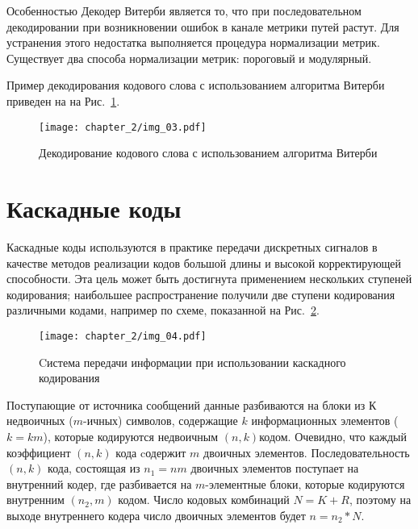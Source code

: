 Особенностью Декодер Витерби является то, что при последовательном декодировании при возникновении
ошибок в канале метрики путей растут. Для устранения этого недостатка выполняется процедура
нормализации метрик. Существует два способа нормализации метрик: пороговый и модулярный.

Пример декодирования кодового слова с использованием алгоритма Витерби приведен на на Рис.~\ref{img_03}.

\begin{figure}[htbp]
\begin{center}
\texttt{[image: chapter\_2/img\_03.pdf]}
\end{center}
\caption{Декодирование кодового слова с использованием алгоритма Витерби}
\label{img_03}
\end{figure}

\section{Каскадные коды}
Каскадные коды используются в практике передачи дискретных сигналов в качестве методов реализации кодов 
большой длины и высокой корректирующей способности. Эта цель может быть достигнута применением нескольких 
ступеней кодирования; наибольшее распространение получили две ступени кодирования различными кодами, например 
по схеме, показанной на Рис.~\ref{img_04}.

\begin{figure}[htbp]
\begin{center}
\texttt{[image: chapter\_2/img\_04.pdf]}
\end{center}
\caption{Cистема передачи информации при использовании каскадного кодирования}
\label{img_04}
\end{figure}

Поступающие от источника сообщений данные разбиваются на блоки из $К$ недвоичных ($m$-ичных) символов, 
содержащие $k$ информационных элементов ($k=km$), которые кодируются недвоичным $(n, k)$кодом. Очевидно, что 
каждый коэффициент $(n, k )$ кода cодержит $m$ двоичных элементов. Последовательность $(n, k)$ кода, 
состоящая из $n_1=nm$ двоичных элементов поступает на внутренний кодер, где разбивается на $m$-элементные 
блоки, которые кодируются внутренним $(n_2, m)$ кодом. Число кодовых комбинаций $N=K+R$, поэтому на выходе 
внутреннего кодера число двоичных элементов будет $n=n_2*N$.

